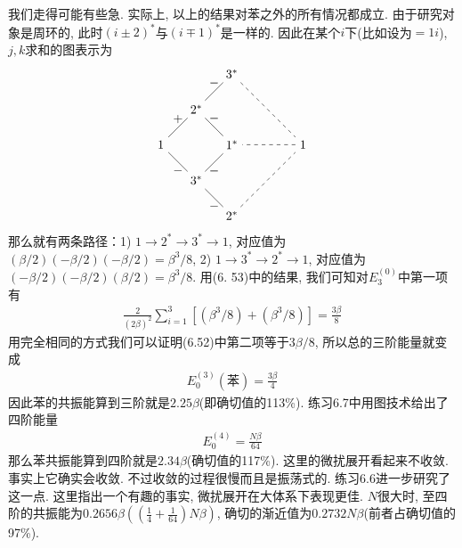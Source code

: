 我们走得可能有些急. 
实际上, 
以上的结果对苯之外的所有情况都成立. 
由于研究对象是周环的, 
此时$(i\pm 2)^*$与$(i\mp1)^*$是一样的. 
因此在某个$i$下(比如设为$=1i$), 
$j,k$求和的图表示为
\begin{align*}
\begin{tikzpicture}[baseline={(0,0)}]
\node(i)at(0,0){$1$};\node(ip1)at(1,1){$2^*$};\node(ip2)at(2,2){$3^*$};\node(is)at(2,0){$1^*$};\node(im1)at(1,-1){$3^*$};\node(im2)at(2,-2){$2^*$};\node(ie)at(4,0){$1$};
\draw (i)--node[above]{+}(ip1)--node[above]{$-$}(is)--node[below]{$-$}(im1)--node[below]{$-$}(i);
\draw (ip1)--node[above]{$-$}(ip2);
\draw (im1)--node[below]{$-$}(im2);
\draw[dashed] (ip2)--(ie)--(is);
\draw[dashed] (im2)--(ie);
\end{tikzpicture}
\end{align*}
那么就有两条路径：1) $1\to2^*\to3^*\to1$, 
对应值为$(\beta/2)(-\beta/2)(-\beta/2)=\beta^3/8$, 
2) $1\to3^*\to2^*\to1$, 
对应值为$(-\beta/2)(-\beta/2)(\beta/2)=\beta^3/8$. 
用(6.
53)中的结果, 
我们可知对$E_3^{(0)}$中第一项有
\begin{align*}
\frac{2}{(2\beta)^2} \sum_{i=1}^{3}[(\beta^3/8)+(\beta^3/8)] = \frac{3\beta}{8}
\end{align*}
用完全相同的方式我们可以证明(6.52)中第二项等于$3\beta/8$, 所以总的三阶能量就变成
\begin{align}
E_0^{(3)}(\text{苯}) = \frac{3\beta}{4}
\end{align}
因此苯的共振能算到三阶就是$2.25\beta$(即确切值的113\%). 
练习6.7中用图技术给出了四阶能量
\begin{align}
E_0^{(4)} = \frac{N\beta}{64}
\end{align}
那么苯共振能算到四阶就是$2.34\beta$(确切值的117\%). 
这里的微扰展开看起来不收敛. 
事实上它确实会收敛. 
不过收敛的过程很慢而且是振荡式的. 
练习6.6进一步研究了这一点. 
这里指出一个有趣的事实, 
微扰展开在大体系下表现更佳. 
$N$很大时, 
至四阶的共振能为$0.2656\beta((\frac{1}{4}+\frac{1}{64})N\beta)$, 
确切的渐近值为$0.2732N\beta$(前者占确切值的97\%).

